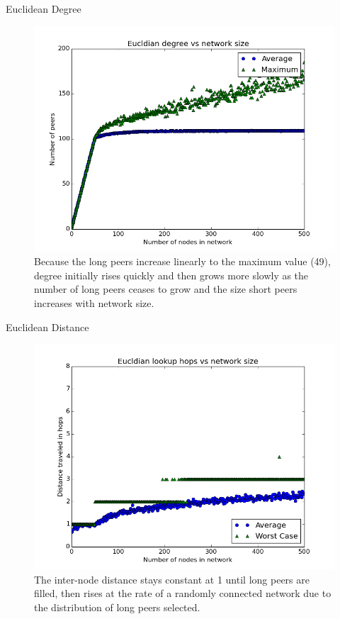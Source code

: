 \documentclass[11pt]{beamer}
\begin{document}
\begin{frame}{Euclidean Degree}

\begin{figure}
	\centering
	\includegraphics[width=0.7\linewidth]{figs/EucldianDegree}
	\caption[Growth of UrDHT degree]{Because the long peers increase linearly to the maximum value (49), degree initially rises quickly and then grows  more slowly as the number of long peers ceases to grow and the size short peers increases with network size. }
	\label{fig:EucldianDegree}
\end{figure}
\end{frame}


\begin{frame}{Euclidean Distance}
	\begin{figure}
		\centering
		\includegraphics[width=0.7\linewidth]{figs/EucldianDistance}
		\caption[Hops in Euclidean UrDHT]{The inter-node distance stays constant at 1 until long peers are filled, then rises at the rate of a randomly connected network due to the distribution of long peers selected.}
		\label{fig:EucldianDistance}
	\end{figure}
\end{frame}
	
\end{document}
